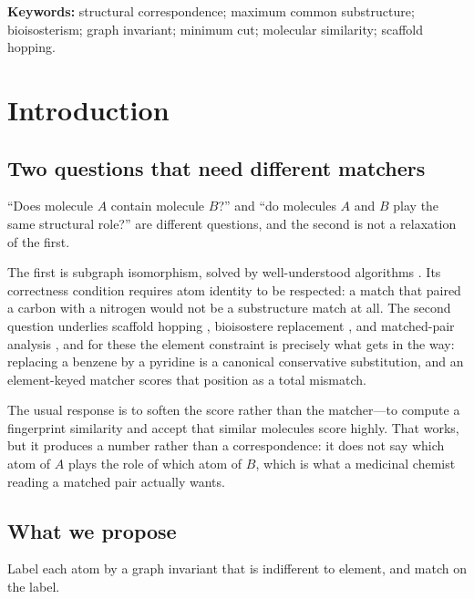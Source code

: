 \documentclass[11pt,twocolumn,a4paper]{article}
\theoremstyle{scthm}
\theoremstyle{definition}
\theoremstyle{remark}
\begin{document}
\noindent\textbf{Keywords:} structural correspondence; maximum common
substructure; bioisosterism; graph invariant; minimum cut; molecular
similarity; scaffold hopping.

\tableofcontents

\section{Introduction}
\label{sec:intro}

\subsection{Two questions that need different matchers}

``Does molecule $A$ contain molecule $B$?'' and ``do molecules $A$ and $B$
play the same structural role?'' are different questions, and the second
is not a relaxation of the first.

The first is subgraph isomorphism, solved by well-understood algorithms
\citep{ullmann1976,cordella2004,ehrlich2012}. Its correctness condition
requires atom identity to be respected: a match that paired a carbon with
a nitrogen would not be a substructure match at all. The second question
underlies scaffold hopping \citep{schneider1999,brown2006}, bioisostere
replacement \citep{patani1996,meanwell2011,wirth2013}, and matched-pair
analysis \citep{griffen2011,hussain2010}, and for these the element
constraint is precisely what gets in the way: replacing a benzene by a
pyridine is a canonical conservative substitution, and an element-keyed
matcher scores that position as a total mismatch.

The usual response is to soften the score rather than the matcher---to
compute a fingerprint similarity \citep{rogers2010,willett1998,maggiora2014}
and accept that similar molecules score highly. That works, but it
produces a number rather than a correspondence: it does not say which atom
of $A$ plays the role of which atom of $B$, which is what a medicinal
chemist reading a matched pair actually wants.

\subsection{What we propose}

Label each atom by a graph invariant that is indifferent to element, and
match on the label.
\end{document}
